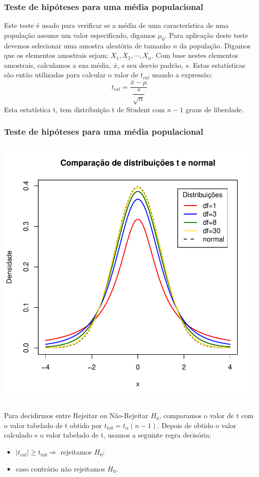 \documentclass[14pt,aspectratio=1610]{beamer}
\newcommand{\bx}{\ensuremath{\bar{x}}}
\newcommand{\Ho}{\ensuremath{H_{0}}}
\begin{document}
\begin{frame}{}
\frametitle{Teste de hipóteses para uma média populacional}
\begin{block}{}
\justifying
Este teste é usado para verificar se a média de uma característica de uma população assume um valor especificado, 
digamos $\mu_{0}$. Para aplicação deste teste devemos selecionar uma amostra aleatória de tamanho $n$ da população. 
Digamos que os elementos amostrais sejam; $X_{1},X_{2},\cdots,X_{n}.$ Com base nestes elementos amostrais, 
calculamos a sua média, $\bx$, e seu desvio padrão, $s$. Estas estatísticas são então utilizadas para calcular o valor de $t_{cal}$ 
usando a expressão:
$$t_{cal}=\dfrac{\bx-\mu}{\dfrac{s}{\sqrt{n}}}$$
Esta estatística t, tem distribuição t de Student com $n-1$ graus de liberdade. 
\end{block}
\end{frame}

\begin{frame}[fragile]{}
\frametitle{Teste de hipóteses para uma média populacional}
\begin{center}
\includegraphics{Aula16-001}
\end{center}
\end{frame}

\begin{frame}{}
\frametitle{}
\begin{block}{}
\justifying
Para decidirmos entre Rejeitar ou Não-Rejeitar $\Ho$, comparamos o valor de t com o valor tabelado de t obtido por 
$t_{tab}=t_{\alpha}(n-1).$ Depois de obtido o valor calculado e o valor tabelado de t, usamos a seguinte regra
decisória:
\begin{itemize}
\item $|t_{cal}|\geq t_{tab}\Rightarrow$ rejeitamos $\Ho;$
\item caso contrário não rejeitamos $\Ho.$
\end{itemize}
\end{block}
\end{frame}
\end{document}
